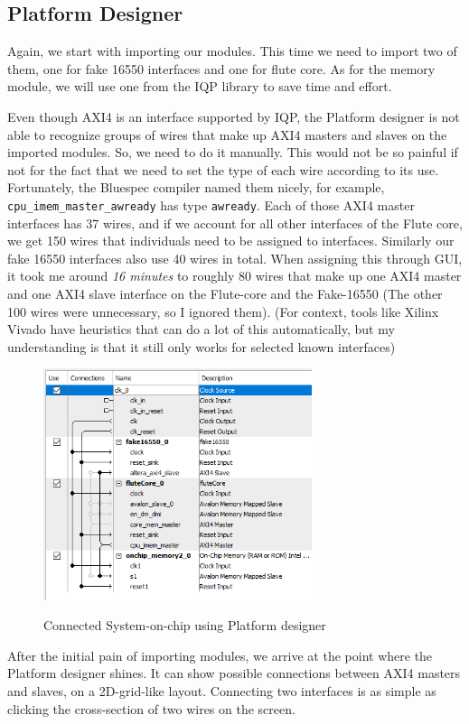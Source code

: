 \documentclass[12pt]{report}
\begin{document}
\subsection{Platform Designer} 
Again, we start with importing our modules.  
This time we need to import two of them, one for fake 16550 interfaces and one for flute core.  
As for the memory module, we will use one from the IQP library to save time and effort. 
\par 
Even though AXI4 is an interface supported by IQP, the Platform designer is not able to recognize groups of wires that make up AXI4 masters and slaves on the imported modules. 
So, we need to do it manually. This would not be so painful if not for the fact that we need to set the type of each wire according to its use. Fortunately, the Bluespec compiler named them nicely, for example, \verb!cpu_imem_master_awready! has type \verb!awready!. Each of those AXI4 master interfaces has 37 wires, and if we account for all other interfaces of the Flute core, we get 150 wires that individuals need to be assigned to interfaces. Similarly our fake 16550 interfaces also use 40 wires in total. When assigning this through GUI, it took me around \emph{16 minutes} to roughly 80 wires that make up one AXI4 master and one AXI4 slave interface on the Flute-core and the Fake-16550 (The other 100 wires were unnecessary, so I ignored them). (For context, tools like Xilinx Vivado have heuristics that can do a lot of this automatically, but my understanding is that it still only works for selected known interfaces) 
\\ 
\begin{figure}[H] 
   \caption{Connected System-on-chip using Platform designer} 
   \includegraphics[width=0.7\textwidth]{images/Example2QSys.png} \\ 
   \centering 
\end{figure} 
After the initial pain of importing modules, we arrive at the point where the Platform designer shines. It can show possible connections between AXI4 masters and slaves, on a 2D-grid-like layout. Connecting two interfaces is as simple as clicking the cross-section of two wires on the screen.  
\end{document}
